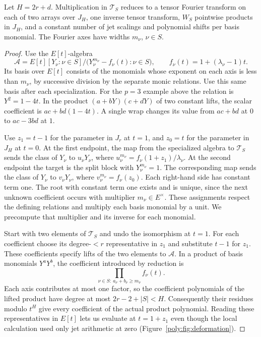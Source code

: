 \begin{lemma}\label{poly:lem:descent-deform}
Let $H=2r+d$. Multiplication in $\mathcal T_S$ reduces to a tensor
Fourier transform on each of two arrays over $J_H$, one inverse tensor
transform, $W_S$ pointwise products in $J_H$, and a constant number
of jet scalings and polynomial shifts per basis monomial. The Fourier
axes have widths $m_\nu$, $\nu\in S$.
\end{lemma}
\begin{proof}
Use the $E[t]$-algebra
\[
 \mathcal A=E[t][Y_\nu:\nu\in S]/
 \bigl(Y_\nu^{m_\nu}-f_\nu(t):\nu\in S\bigr),
 \qquad f_\nu(t)=1+(\lambda_\nu-1)t.
\]
Its basis over $E[t]$ consists of the monomials whose exponent on each axis
is less than $m_\nu$, by successive division by the separate monic
relations. Use this same basis after each specialization. For the
$p=3$ example above the relation is $Y^2=1-4t$. In the product
$(a+bY)(c+dY)$ of two constant lifts, the scalar coefficient is
$ac+bd(1-4t)$. A single wrap changes its value from $ac+bd$ at $0$
to $ac-3bd$ at $1$.

Use $z_1=t-1$ for the parameter in $J_r$ at $t=1$, and $z_0=t$
for the parameter in $J_H$ at $t=0$. At the first endpoint, the map
from the specialized algebra to $\mathcal T_S$ sends the class of
$Y_\nu$ to $u_\nu Y_\nu$, where
$u_\nu^{m_\nu}=f_\nu(1+z_1)/\lambda_\nu$.
At the second endpoint the target is the split block with
$Y_\nu^{m_\nu}=1$. The corresponding map sends the class of $Y_\nu$
to $v_\nu Y_\nu$, where $v_\nu^{m_\nu}=f_\nu(z_0)$.
Each right-hand side has constant term one. The root with constant term
one exists and is unique, since the next unknown coefficient occurs
with multiplier $m_\nu\in E^\times$. These assignments respect the
defining relations and multiply each basis monomial by a unit.
We precompute that multiplier and its inverse for each monomial.

Start with two elements of $\mathcal T_S$ and undo the isomorphism
at $t=1$. For each coefficient choose its degree-$<r$ representative
in $z_1$ and substitute $t-1$ for $z_1$. These coefficients specify lifts
of the two elements to $\mathcal A$. In a product of basis monomials
$Y^aY^b$, the coefficient introduced by reduction is
\[
  \prod_{\nu\in S:\ a_\nu+b_\nu\ge m_\nu} f_\nu(t).
\]
Each axis contributes at most one factor, so the coefficient polynomials
of the lifted product have degree at most $2r-2+|S|<H$. Consequently their residues modulo $t^H$ give every coefficient of
the actual product polynomial. Reading these representatives in $E[t]$
lets us evaluate at $t=1+z_1$ even though the local calculation used
only jet arithmetic at zero (Figure~\ref{poly:fig:deformation}).



\end{proof}
